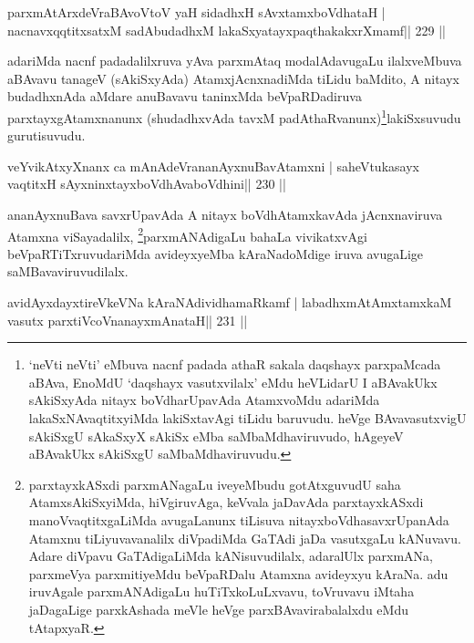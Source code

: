 
\begin{shl}
parxmAtArxdeVraBAvoV\s toV yaH sidadhxH sAvxtamxboVdhataH |
nacnavxqqtitxsatxM sadAbudadhxM lakaSxyatayxpaqthakakxrXmamf\hfill || 229 ||
\end{shl}

\begin{artha}
adariMda nacnf padadalilxruva yAva parxmAtaq modalAdavugaLu
ilalxveMbuva aBAvavu tanageV (sAkiSxyAda) AtamxjAcnxnadiMda tiLidu
baMdito, A nitayx budadhxnAda aMdare anuBavavu taninxMda
beVpaRDadiruva parxtayxgAtamxnanunx (shudadhxvAda
tavxM padAthaRvanunx)\footnote{`neVti neVti' eMbuva nacnf padada
  athaR sakala daqshayx parxpaMcada aBAva, EnoMdU `daqshayx
  vasutxvilalx' eMdu heVLidarU I aBAvakUkx sAkiSxyAda nitayx
  boVdharUpavAda AtamxvoMdu adariMda lakaSxNAvaqtitxyiMda lakiSxtavAgi
tiLidu baruvudu. heVge BAvavasutxvigU sAkiSxgU sAkaSxyX sAkiSx eMba
saMbaMdhaviruvudo, hAgeyeV aBAvakUkx sAkiSxgU saMbaMdhaviruvudu.}lakiSxsuvudu
gurutisuvudu.
\end{artha}

\vskip 2pt
\begin{shl}
veYvikAtxyXnanx ca mAnAdeVrananAyxnuBavAtamxni |
saheVtukasayx vaqtitxH sAyxninxtayxboVdhAvaboVdhini\hfill || 230 ||
\end{shl}
\vskip 2pt
\begin{artha}
ananAyxnuBava savxrUpavAda A nitayx boVdhAtamxkavAda jAcnxnaviruva
Atamxna viSayadalilx, \footnote{parxtayxkASxdi parxmANagaLu
  iveyeMbudu gotAtxguvudU saha AtamxsAkiSxyiMda, hiVgiruvAga, keVvala
jaDavAda parxtayxkASxdi manoVvaqtitxgaLiMda avugaLanunx tiLisuva
nitayxboVdhasavxrUpanAda Atamxnu tiLiyuvavanalilx diVpadiMda GaTAdi
jaDa vasutxgaLu kANuvavu. Adare diVpavu GaTAdigaLiMda kANisuvudilalx,
adaralUlx parxmANa, parxmeVya parxmitiyeMdu beVpaRDalu Atamxna
avideyxyu kAraNa. adu iruvAgale parxmANAdigaLu huTiTxkoLuLxvavu,
toVruvavu iMtaha jaDagaLige parxkAshada meVle heVge 
parxBAvavirabalalxdu eMdu tAtapxyaR.}parxmANAdigaLu bahaLa vivikatxvAgi
beVpaRTiTxruvudariMda avideyxyeMba kAraNadoMdige iruva avugaLige
saMBavaviruvudilalx.
\end{artha}
\vskip 2pt
\vskip 2pt
\begin{shl}
avidAyxdayxtireVkeVNa kAraNAdividhamaRkamf |
labadhxmAtAmxtamxkaM vasutx parxtiVcoV\s nanayxmAnataH\hfill || 231 ||
\end{shl}

